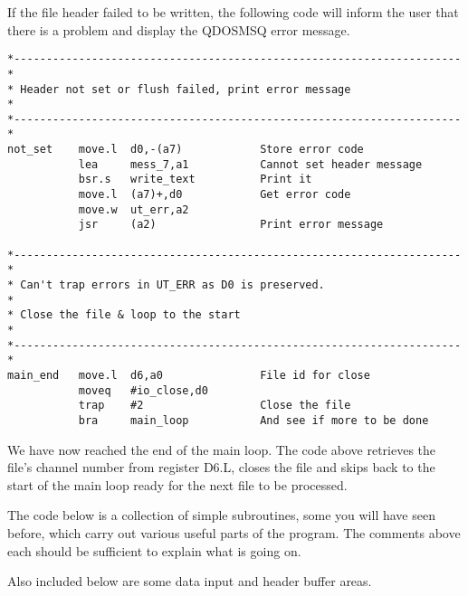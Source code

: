 If the file header failed to be written, the following code will
    inform the user that there is a problem and display the QDOSMSQ error
    message.

\begin{lstlisting}[firstnumber=last,caption={Dataspace Program - Part 13 - Error Handling}]
*---------------------------------------------------------------------*
* Header not set or flush failed, print error message                 *
*---------------------------------------------------------------------*
not_set    move.l  d0,-(a7)            Store error code
           lea     mess_7,a1           Cannot set header message
           bsr.s   write_text          Print it
           move.l  (a7)+,d0            Get error code
           move.w  ut_err,a2
           jsr     (a2)                Print error message

*---------------------------------------------------------------------*
* Can't trap errors in UT_ERR as D0 is preserved.                     *
* Close the file & loop to the start                                  *
*---------------------------------------------------------------------*
main_end   move.l  d6,a0               File id for close
           moveq   #io_close,d0
           trap    #2                  Close the file
           bra     main_loop           And see if more to be done
\end{lstlisting}

We have now reached the end of the main loop. The code above
    retrieves the file's channel number from register D6.L, closes the file
    and skips back to the start of the main loop ready for the next file to be
    processed.

The code below is a collection of simple subroutines, some you will
    have seen before, which carry out various useful parts of the program. The
    comments above each should be sufficient to explain what is going
    on.

Also included below are some data input and header buffer
    areas.

